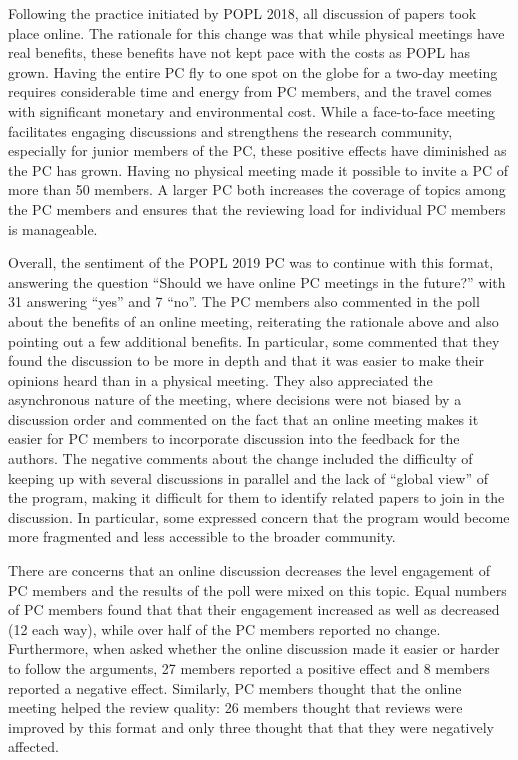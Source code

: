 Following the practice initiated by POPL 2018, all discussion of papers took
place online. The rationale for this change was that while physical meetings
have real benefits, these benefits have not kept pace with the costs as POPL
has grown.  Having the entire PC fly to one spot on the globe for a two-day
meeting requires considerable time and energy from PC members, and the travel
comes with significant monetary and environmental cost.  While a face-to-face
meeting facilitates engaging discussions and strengthens the research
community, especially for junior members of the PC, these positive effects
have diminished as the PC has grown. Having no physical meeting made it
possible to invite a PC of more than 50 members. A larger PC both increases
the coverage of topics among the PC members and ensures that the reviewing
load for individual PC members is manageable.

Overall, the sentiment of the POPL 2019 PC was to continue with this format,
answering the question ``Should we have online PC meetings in the future?''
with 31 answering ``yes'' and 7 ``no''.  The PC members also commented in
the poll about the benefits of an online meeting, reiterating the rationale
above and also pointing out a few additional benefits. In particular, some
commented that they found the discussion to be more in depth and that it was
easier to make their opinions heard than in a physical meeting. They also
appreciated the asynchronous nature of the meeting, where decisions were not
biased by a discussion order and commented on the fact that an online meeting
makes it easier for PC members to incorporate discussion into the
feedback for the authors.  The negative comments about the change included the
difficulty of keeping up with several discussions in parallel and the lack of
``global view'' of the program, making it difficult for them to identify
related papers to join in the discussion. In particular, some expressed
concern that the program would become more fragmented and less accessible to
the broader community.

There are concerns that an online discussion decreases the level engagement of
PC members and the results of the poll were mixed on this topic. Equal numbers
of PC members found that that their engagement increased as well as decreased
(12 each way), while over half of the PC members reported no
change. Furthermore, when asked whether the online discussion made it easier
or harder to follow the arguments, 27 members reported a positive effect and 8
members reported a negative effect.  Similarly, PC members thought that the
online meeting helped the review quality: 26 members thought that reviews were
improved by this format and only three thought that that they were negatively
affected.

